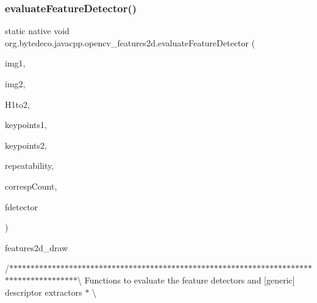 \subsubsection{\texorpdfstring{evaluate\+Feature\+Detector()}{evaluateFeatureDetector()}}
{\footnotesize\ttfamily static native void org.\+bytedeco.\+javacpp.\+opencv\+\_\+features2d.\+evaluate\+Feature\+Detector (\begin{DoxyParamCaption}\item[{@Const @By\+Ref Mat}]{img1,  }\item[{@Const @By\+Ref Mat}]{img2,  }\item[{@Const @By\+Ref Mat}]{H1to2,  }\item[{Key\+Point\+Vector}]{keypoints1,  }\item[{Key\+Point\+Vector}]{keypoints2,  }\item[{@By\+Ref Float\+Pointer}]{repeatability,  }\item[{@By\+Ref Int\+Pointer}]{corresp\+Count,  }\item[{@Cast(\char`\"{}cv\+::\+Feature\+Detector$\ast$\char`\"{}) @Ptr Feature2D}]{fdetector }\end{DoxyParamCaption})\hspace{0.3cm}{\ttfamily [static]}}

features2d\+\_\+draw 

/$\ast$$\ast$$\ast$$\ast$$\ast$$\ast$$\ast$$\ast$$\ast$$\ast$$\ast$$\ast$$\ast$$\ast$$\ast$$\ast$$\ast$$\ast$$\ast$$\ast$$\ast$$\ast$$\ast$$\ast$$\ast$$\ast$$\ast$$\ast$$\ast$$\ast$$\ast$$\ast$$\ast$$\ast$$\ast$$\ast$$\ast$$\ast$$\ast$$\ast$$\ast$$\ast$$\ast$$\ast$$\ast$$\ast$$\ast$$\ast$$\ast$$\ast$$\ast$$\ast$$\ast$$\ast$$\ast$$\ast$$\ast$$\ast$$\ast$$\ast$$\ast$$\ast$$\ast$$\ast$$\ast$$\ast$$\ast$$\ast$$\ast$$\ast$$\ast$$\ast$$\ast$$\ast$$\ast$$\ast$$\ast$$\ast$$\ast$$\ast$$\ast$$\ast$$\ast$$\ast$$\ast$$\ast$$\ast$$\ast$\textbackslash{} Functions to evaluate the feature detectors and \mbox{[}generic\mbox{]} descriptor extractors $\ast$ \textbackslash{} 